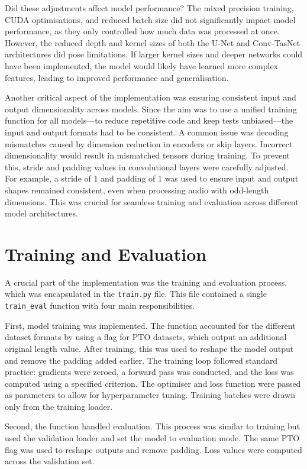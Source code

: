 Did these adjustments affect model performance? The mixed precision training, CUDA optimisations, and reduced batch size did not significantly impact model performance, as they only controlled how much data was processed at once. However, the reduced depth and kernel sizes of both the U-Net and Conv-TasNet architectures did pose limitations. If larger kernel sizes and deeper networks could have been implemented, the model would likely have learned more complex features, leading to improved performance and generalisation.

Another critical aspect of the implementation was ensuring consistent input and output dimensionality across models. Since the aim was to use a unified training function for all models—to reduce repetitive code and keep tests unbiased—the input and output formats had to be consistent. A common issue was decoding mismatches caused by dimension reduction in encoders or skip layers. Incorrect dimensionality would result in mismatched tensors during training. To prevent this, stride and padding values in convolutional layers were carefully adjusted. For example, a stride of 1 and padding of 1 was used to ensure input and output shapes remained consistent, even when processing audio with odd-length dimensions. This was crucial for seamless training and evaluation across different model architectures.

\section{Training and Evaluation}
\label{sec:training_and_evaluation}

A crucial part of the implementation was the training and evaluation process, which was encapsulated in the \texttt{train.py} file. This file contained a single \texttt{train\_eval} function with four main responsibilities.

First, model training was implemented. The function accounted for the different dataset formats by using a flag for PTO datasets, which output an additional original length value. After training, this was used to reshape the model output and remove the padding added earlier. The training loop followed standard practice: gradients were zeroed, a forward pass was conducted, and the loss was computed using a specified criterion. The optimiser and loss function were passed as parameters to allow for hyperparameter tuning. Training batches were drawn only from the training loader.

Second, the function handled evaluation. This process was similar to training but used the validation loader and set the model to evaluation mode. The same PTO flag was used to reshape outputs and remove padding. Loss values were computed across the validation set.

